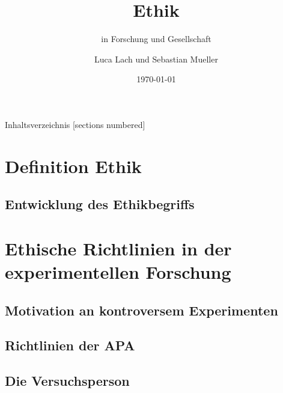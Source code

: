 \documentclass[10pt]{beamer}
\title{Ethik}
\subtitle{in Forschung und Gesellschaft}
\date{\today}
\author{Luca Lach und Sebastian Mueller}
\institute{Aperture Science}
\begin{document}
		
	\maketitle
	
	\begin{frame}{Inhaltsverzeichnis}
		[sections numbered]
		\tableofcontents[hideallsubsections]
	\end{frame}
	
\section{Definition Ethik}
\subsection{Entwicklung des Ethikbegriffs}
\section{Ethische Richtlinien in der experimentellen Forschung}

\subsection{Motivation an kontroversem Experimenten}
\subsection{Richtlinien der APA}
%
\subsection{Die Versuchsperson}
\end{document}
